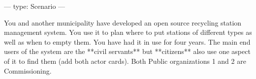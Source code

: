---
type: Scenario
---

You and another municipality have developed an open source recycling station management system. You use it to plan where to put stations of different types as well as when to empty them. You have had it in use for four years. The main end users of the system are the **civil servants** but **citizens** also use one aspect of it to find them (add both actor cards). Both Public organizations 1 and 2 are Commissioning.
